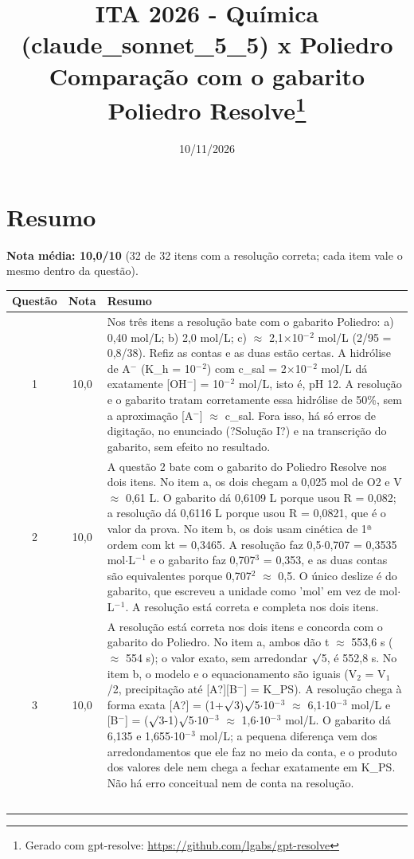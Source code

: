\documentclass{article}%
\title{ITA 2026 {-} Química (claude\_sonnet\_5\_5) x Poliedro\\[4pt]\large Comparação com o gabarito Poliedro Resolve\thanks{Gerado com gpt-resolve: \url{https://github.com/lgabs/gpt-resolve}}}%
\date{10/11/2026}%
\begin{document}
%
\normalsize%
\maketitle%
\section*{Resumo}\textbf{Nota média: 10,0/10} (32 de 32 itens com a resolução correta; cada item vale o mesmo dentro da questão).\par\medskip%
\begin{longtable}{@{}c c p{}@{}}\toprule Questão & Nota & Resumo \\ \midrule
1 & 10,0 & Nos três itens a resolução bate com o gabarito Poliedro: a) 0,40 mol/L; b) 2,0 mol/L; c) $\approx$ 2,1$\times$10$^{-}$$^2$ mol/L (2/95 = 0,8/38). Refiz as contas e as duas estão certas. A hidrólise de A$^{-}$ (K\_h = 10$^{-}$$^2$) com c\_sal = 2$\times$10$^{-}$$^2$ mol/L dá exatamente {[}OH$^{-}${]} = 10$^{-}$$^2$ mol/L, isto é, pH 12. A resolução e o gabarito tratam corretamente essa hidrólise de 50\%, sem a aproximação {[}A$^{-}${]} $\approx$ c\_sal. Fora isso, há só erros de digitação, no enunciado (?Solução I?) e na transcrição do gabarito, sem efeito no resultado. \\
2 & 10,0 & A questão 2 bate com o gabarito do Poliedro Resolve nos dois itens. No item a, os dois chegam a 0,025 mol de O2 e V $\approx$ 0,61 L. O gabarito dá 0,6109 L porque usou R = 0,082; a resolução dá 0,6116 L porque usou R = 0,0821, que é o valor da prova. No item b, os dois usam cinética de 1ª ordem com kt = 0,3465. A resolução faz 0,5$\cdot$0,707 = 0,3535 mol$\cdot$L$^{-}$$^{1}$ e o gabarito faz 0,707$^3$ = 0,353, e as duas contas são equivalentes porque 0,707$^2$ $\approx$ 0,5. O único deslize é do gabarito, que escreveu a unidade como 'mol' em vez de mol$\cdot$L$^{-}$$^{1}$. A resolução está correta e completa nos dois itens. \\
3 & 10,0 & A resolução está correta nos dois itens e concorda com o gabarito do Poliedro. No item a, ambos dão t $\approx$ 553,6 s ($\approx$ 554 s); o valor exato, sem arredondar $\surd$5, é 552,8 s. No item b, o modelo e o equacionamento são iguais (V$_{2}$ = V$_{1}$/2, precipitação até {[}A?{]}{[}B$^{-}${]} = K\_PS). A resolução chega à forma exata {[}A?{]} = (1+$\surd$3)$\surd$5$\cdot$10$^{-}$$^3$ $\approx$ 6,1$\cdot$10$^{-}$$^3$ mol/L e {[}B$^{-}${]} = ($\surd$3-1)$\surd$5$\cdot$10$^{-}$$^3$ $\approx$ 1,6$\cdot$10$^{-}$$^3$ mol/L. O gabarito dá 6,135 e 1,655$\cdot$10$^{-}$$^3$ mol/L; a pequena diferença vem dos arredondamentos que ele faz no meio da conta, e o produto dos valores dele nem chega a fechar exatamente em K\_PS. Não há erro conceitual nem de conta na resolução. \\
$$
\end{longtable}
\end{document}
